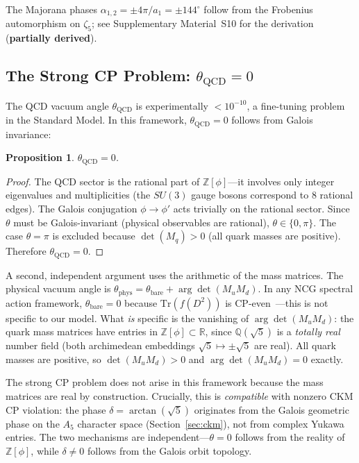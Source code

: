 \documentclass[12pt,a4paper]{article}
\newtheorem{proposition}{Proposition}
\theoremstyle{definition}
\begin{document}
The Majorana phases $\alpha_{1,2} = \pm 4\pi/a_1 = \pm 144^\circ$ follow from the Frobenius automorphism on $\zeta_5$; see Supplementary Material~S10 for the derivation (\textbf{partially derived}).

\subsection{The Strong CP Problem: \texorpdfstring{$\theta_{\text{QCD}} = 0$}{theta\_QCD = 0}}

The QCD vacuum angle $\theta_{\text{QCD}}$ is experimentally $< 10^{-10}$, a fine-tuning problem in the Standard Model. In this framework, $\theta_{\text{QCD}} = 0$ follows from Galois invariance:

\begin{proposition}
$\theta_{\text{QCD}} = 0$.
\end{proposition}
\begin{proof}
The QCD sector is the rational part of $\mathbb{Z}[\phi]$---it involves only integer eigenvalues and multiplicities (the $SU(3)$ gauge bosons correspond to 8 rational edges). The Galois conjugation $\phi \to \phi'$ acts trivially on the rational sector. Since $\theta$ must be Galois-invariant (physical observables are rational), $\theta \in \{0, \pi\}$. The case $\theta = \pi$ is excluded because $\det(M_q) > 0$ (all quark masses are positive). Therefore $\theta_{\text{QCD}} = 0$.
\end{proof}

A second, independent argument uses the arithmetic of the mass matrices.  The physical vacuum angle is $\theta_{\text{phys}} = \theta_{\text{bare}} + \arg\det(M_u M_d)$.  In any NCG spectral action framework, $\theta_{\text{bare}} = 0$ because $\mathrm{Tr}(f(D^2))$ is CP-even~\cite{chamseddine1997}---this is not specific to our model.  What \emph{is} specific is the vanishing of $\arg\det(M_u M_d)$: the quark mass matrices have entries in $\mathbb{Z}[\phi] \subset \mathbb{R}$, since $\mathbb{Q}(\sqrt{5})$ is a \emph{totally real} number field (both archimedean embeddings $\sqrt{5} \mapsto \pm\sqrt{5}$ are real).  All quark masses are positive, so $\det(M_u M_d) > 0$ and $\arg\det(M_u M_d) = 0$ exactly.

The strong CP problem does not arise in this framework because the mass matrices are real by construction.  Crucially, this is \emph{compatible} with nonzero CKM CP violation: the phase $\delta = \arctan(\sqrt{5})$ originates from the Galois geometric phase on the $A_5$ character space (Section~\ref{sec:ckm}), not from complex Yukawa entries.  The two mechanisms are independent---$\theta = 0$ follows from the reality of $\mathbb{Z}[\phi]$, while $\delta \neq 0$ follows from the Galois orbit topology.
\end{document}
